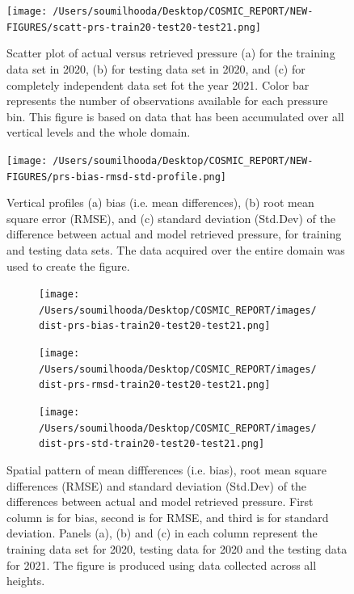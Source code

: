 \documentclass[a4paper,12pt,twoside]{article}
\begin{document}
\begin{figure}[H]
	\centering
	\texttt{[image: /Users/soumilhooda/Desktop/COSMIC\_REPORT/NEW-FIGURES/scatt-prs-train20-test20-test21.png]}
	\caption{Scatter plot of actual versus retrieved pressure (a) for the training data set in 2020, (b) for testing data set in 2020, and (c) for completely independent data set fot the year 2021. Color bar represents the number of observations available for each pressure bin. This figure is based on data that has been accumulated over all vertical levels and the whole domain.}
	\label{fig:img23}
\end{figure}
\begin{figure}[H]
	\centering
	\texttt{[image: /Users/soumilhooda/Desktop/COSMIC\_REPORT/NEW-FIGURES/prs-bias-rmsd-std-profile.png]}
\caption{Vertical profiles (a) bias (i.e. mean differences), (b) root mean square error (RMSE), and (c) standard deviation (Std.Dev) of the difference between actual and model retrieved pressure, for training and testing data sets. The data acquired over the entire domain was used to create the figure. }
	\label{fig:img24}
\end{figure}
\begin{figure}[H]
	\centering
	\begin{subfigure}{0.32\textwidth}
		\centering
		\texttt{[image: /Users/soumilhooda/Desktop/COSMIC\_REPORT/images/dist-prs-bias-train20-test20-test21.png]}
	\end{subfigure}
	\hfill
	\begin{subfigure}{0.32\textwidth}
		\centering
		\texttt{[image: /Users/soumilhooda/Desktop/COSMIC\_REPORT/images/dist-prs-rmsd-train20-test20-test21.png]}
	\end{subfigure}
	\hfill
	\begin{subfigure}{0.32\textwidth}
		\centering
		\texttt{[image: /Users/soumilhooda/Desktop/COSMIC\_REPORT/images/dist-prs-std-train20-test20-test21.png]}
	\end{subfigure}
	\caption{Spatial pattern of mean diffferences (i.e. bias), root mean square differences (RMSE) and standard deviation (Std.Dev) of the differences between actual and model retrieved pressure. First column is for bias, second is for RMSE, and third is for standard deviation. Panels (a), (b) and (c) in each column represent the training data set for 2020, testing data for 2020 and the testing data for 2021. The figure is produced using data collected across all heights.}

\label{fig:img18}
\end{figure}
\end{document}

